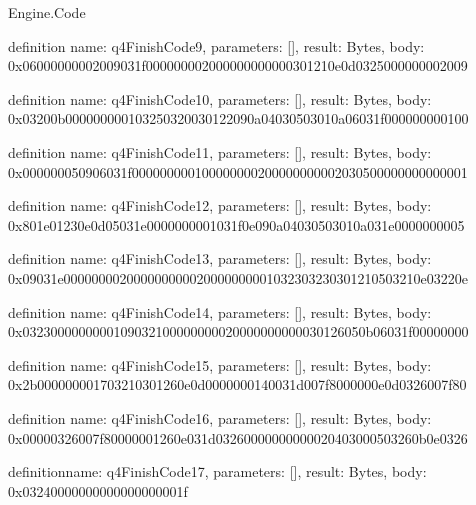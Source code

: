 \begin{lexlean}{Engine.Code}
\begin{semanticmodule}
definition{
  name: q4FinishCode9,
  parameters: [],
  result: Bytes,
  body: 0x06000000002009031f000000002000000000000301210e0d0325000000002009
}

definition{
  name: q4FinishCode10,
  parameters: [],
  result: Bytes,
  body: 0x03200b000000000103250320030122090a04030503010a06031f000000000100
}

definition{
  name: q4FinishCode11,
  parameters: [],
  result: Bytes,
  body: 0x000000050906031f000000000100000000200000000002030500000000000001
}

definition{
  name: q4FinishCode12,
  parameters: [],
  result: Bytes,
  body: 0x801e01230e0d05031e0000000001031f0e090a04030503010a031e0000000005
}

definition{
  name: q4FinishCode13,
  parameters: [],
  result: Bytes,
  body: 0x09031e000000002000000000020000000001032303230301210503210e03220e
}

definition{
  name: q4FinishCode14,
  parameters: [],
  result: Bytes,
  body: 0x0323000000000109032100000000020000000000030126050b06031f00000000
}

definition{
  name: q4FinishCode15,
  parameters: [],
  result: Bytes,
  body: 0x2b000000001703210301260e0d0000000140031d007f8000000e0d0326007f80
}

definition{
  name: q4FinishCode16,
  parameters: [],
  result: Bytes,
  body: 0x00000326007f80000001260e031d03260000000000020403000503260b0e0326
}

definition{name: q4FinishCode17, parameters: [], result: Bytes, body: 0x03240000000000000000001f}
\end{semanticmodule}
\end{lexlean}

